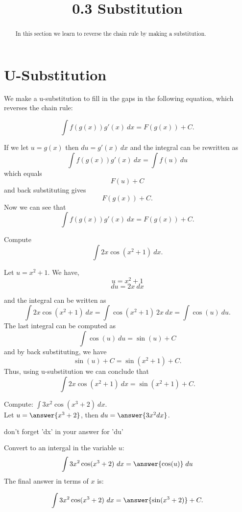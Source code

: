 \documentclass{ximera}
\title{0.3 Substitution}
\begin{document}
\begin{abstract}
In this section we learn to reverse the chain rule by making a substitution.
\end{abstract}

\maketitle

\section{U-Substitution}

We make a u-substitution to fill in the gaps in the following equation, which reverses the chain rule:

\[\int f(g(x))g'(x) \ dx = F(g(x)) + C. \]

If we let $ u = g(x)$ then $du = g'(x) \ dx$ and the integral can be rewritten as
\[\int f(g(x))g'(x) \ dx = \int f(u) \ du \]
which equals
\[F(u) + C\]
and back substituting gives
\[F(g(x)) + C. \]
Now we can see that
\[\int f(g(x))g'(x) \ dx = F(g(x)) + C. \]



\begin{example}
Compute 
\[\int 2x\cos(x^2 + 1) \ dx.\]

Let $u = x^2 + 1$.  We have,
\[u = x^2 + 1\]
\[du = 2x \ dx\]

and the integral can be written as 
\[\int 2x\cos(x^2 + 1) \ dx = \int \cos(x^2 + 1) \ 2x\  dx = \int \cos(u) \ du.\]
The last integral can be computed as 
\[\int \cos(u) \ du = \sin(u) + C\]
and by back substituting, we have 
\[\sin(u) + C = \sin(x^2 + 1) + C.\]
Thus, using u-substitution we can conclude that
\[\int 2x\cos(x^2 + 1) \ dx =  \sin(x^2 + 1) + C.\]
\end{example}

\begin{problem} Compute: $\displaystyle{\int 3x^2\cos(x^3 + 2) \ dx.}$\\
Let $u = \answer{x^3 + 2}$, then $du = \answer{3x^2 dx}$.\\
\begin{hint}
don't forget 'dx' in your answer for 'du'
\end{hint}
Convert to an intergal in the variable $u$:
\[\int 3x^2\cos(x^3 + 2) \ dx = \answer{\cos(u)} \; du\]
The final answer in terms of $x$ is:

\[\int 3x^2\cos(x^3 + 2) \ dx = \answer{\sin(x^3 + 2)} +C.\]
\end{problem}
\end{document}
